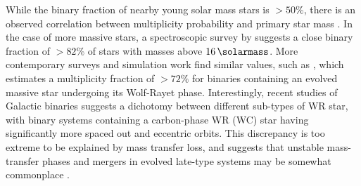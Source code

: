 While the binary fraction of nearby young solar mass stars is $>50\%$, there is an observed correlation between multiplicity probability and primary star mass \parencite{fuhrmannMultiplicitySolartypeStars2017}.
In the case of more massive stars, a spectroscopic survey by 
\textcite{chiniSpectroscopicSurveyMultiplicity2012} suggests a close binary fraction of $>82\%$ of stars with masses above $16 \, \si{\solarmass}$.
More contemporary surveys and simulation work find similar values, such as \textcite{dsilvaSpectroscopicMultiplicitySurvey2020}, which estimates a multiplicity fraction of $>72\%$ for binaries containing an evolved massive star undergoing its Wolf-Rayet phase.
Interestingly, recent studies of Galactic binaries suggests a dichotomy between different sub-types of WR star, with binary systems containing a carbon-phase WR (WC) star having significantly more spaced out and eccentric orbits.
This discrepancy is too extreme to be explained by mass transfer loss, and suggests that unstable mass-transfer phases and mergers in evolved late-type systems may be somewhat commonplace
\parencite{dsilvaSpectroscopicMultiplicitySurvey2022,dsilvaSpectroscopicMultiplicitySurvey2022a,dsilvaSpectroscopicMultiplicitySurvey2020}.

\begin{center}
\end{center}





